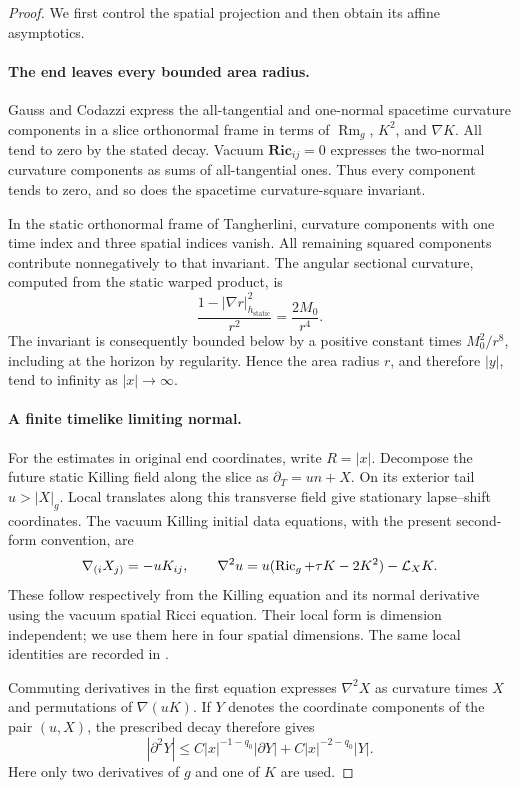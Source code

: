 \begin{proof}
We first control the spatial projection and then obtain its affine asymptotics.

\paragraph{The end leaves every bounded area radius.}
Gauss and Codazzi express the all-tangential and one-normal spacetime
curvature components in a slice orthonormal frame in terms of
$\operatorname{Rm}_g$, $K^2$, and $\nabla K$.  All tend to zero by the stated
decay.  Vacuum $\mathbf{Ric}_{ij}=0$ expresses the two-normal curvature
components as sums of all-tangential ones.  Thus every component tends to
zero, and so does the spacetime curvature-square invariant.

In the static orthonormal frame of Tangherlini, curvature components with
one time index and three spatial indices vanish.  All remaining squared
components contribute nonnegatively to that invariant.  The angular
sectional curvature, computed from the static warped product, is
\[
 \frac{1-|\nabla r|_{h_{\mathrm{static}}}^2}{r^2}
 =\frac{2M_0}{r^4}.
\]
The invariant is consequently bounded below by a positive constant times
$M_0^2/r^8$, including at the horizon by regularity.  Hence the area radius
$r$, and therefore $|y|$, tend to infinity as $|x|\to\infty$.

\paragraph{A finite timelike limiting normal.}
For the estimates in original end coordinates, write $R=|x|$.
Decompose the future static Killing field along the slice as
$\partial_T=u n+X$.  On its exterior tail $u>|X|_g$.  Local translates along
this transverse field give stationary lapse--shift coordinates.  The vacuum
Killing initial data equations, with the present second-form convention, are
\begin{equation}
 \nabla_{(i}X_{j)}=-uK_{ij},\qquad
 \nabla^2u=u(\operatorname{Ric}_g+\tau K-2K^2)-\mathcal L_XK.
 \label{q4:rec:vacuum-kid}
\end{equation}
These follow respectively from the Killing equation and its normal
derivative using the vacuum spatial Ricci equation.  Their local form is
dimension independent; we use them here in four spatial dimensions.  The
same local identities are recorded in
\cite[Section~2]{BeigChrusciel1997KID}.

Commuting derivatives in the first equation expresses $\nabla^2X$ as
curvature times $X$ and permutations of $\nabla(uK)$.  If $Y$ denotes the
coordinate components of the pair $(u,X)$, the prescribed decay therefore
gives
\begin{equation}
 |\partial^2Y|
 \leq C|x|^{-1-q_0}|\partial Y|+C|x|^{-2-q_0}|Y|.
 \label{q4:rec:jet-estimate}
\end{equation}
Here only two derivatives of $g$ and one of $K$ are used.


\end{proof}
